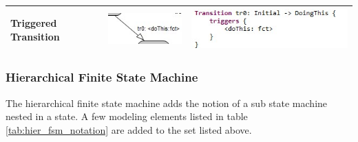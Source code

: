 \begin{table}
\begin{tabular}{|l|c|l|}
\hline
 Triggered Transition & \includegraphics[scale=0.7]{images/040-TriggeredTransition.jpg} & 
\includegraphics[scale=0.7]{images/040-TriggeredTransitionTextual.jpg} \\
\hline
\end{tabular}
\end{table}


\subsubsection{Hierarchical Finite State Machine}

The hierarchical finite state machine adds the notion of a sub state machine nested in a state.
A few modeling elements listed in table \ref{tab:hier_fsm_notation} are added to the set listed above.

